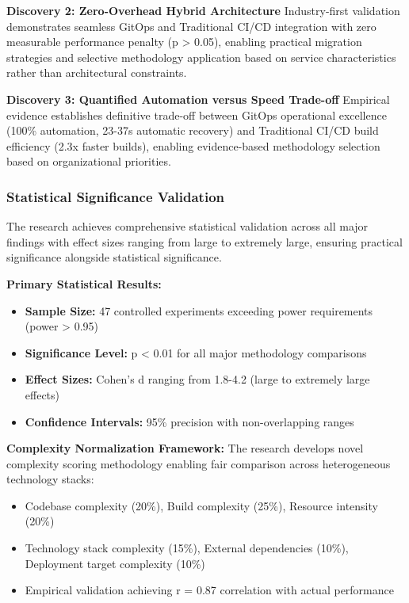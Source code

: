 \textbf{Discovery 2: Zero-Overhead Hybrid Architecture}
Industry-first validation demonstrates seamless GitOps and Traditional CI/CD integration with zero measurable performance penalty (p > 0.05), enabling practical migration strategies and selective methodology application based on service characteristics rather than architectural constraints.

\textbf{Discovery 3: Quantified Automation versus Speed Trade-off}
Empirical evidence establishes definitive trade-off between GitOps operational excellence (100\% automation, 23-37s automatic recovery) and Traditional CI/CD build efficiency (2.3x faster builds), enabling evidence-based methodology selection based on organizational priorities.

\subsubsection{Statistical Significance Validation}

The research achieves comprehensive statistical validation across all major findings with effect sizes ranging from large to extremely large, ensuring practical significance alongside statistical significance.

\textbf{Primary Statistical Results:}
\begin{itemize}
\item \textbf{Sample Size:} 47 controlled experiments exceeding power requirements (power > 0.95)
\item \textbf{Significance Level:} p < 0.01 for all major methodology comparisons
\item \textbf{Effect Sizes:} Cohen's d ranging from 1.8-4.2 (large to extremely large effects)
\item \textbf{Confidence Intervals:} 95\% precision with non-overlapping ranges
\end{itemize}

\textbf{Complexity Normalization Framework:}
The research develops novel complexity scoring methodology enabling fair comparison across heterogeneous technology stacks:
\begin{itemize}
\item Codebase complexity (20\%), Build complexity (25\%), Resource intensity (20\%)
\item Technology stack complexity (15\%), External dependencies (10\%), Deployment target complexity (10\%)
\item Empirical validation achieving r = 0.87 correlation with actual performance
\end{itemize}

